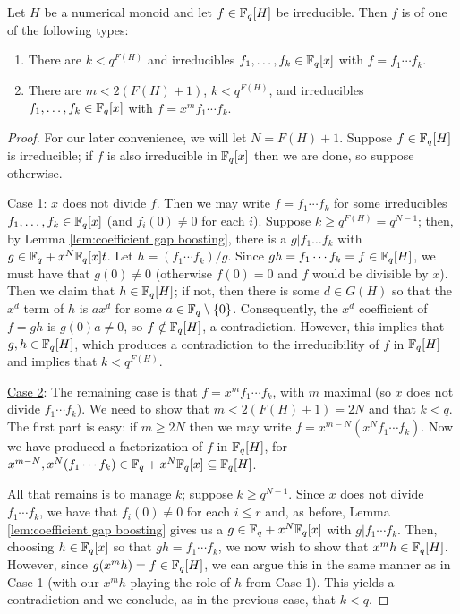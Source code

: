 \begin{prop}\label{prop:num ring atom classification}
Let $H$ be a numerical monoid and let $f\in \mathbb{F}_q[H]$ be irreducible.
Then $f$ is of one of the following types:
\begin{enumerate}[label=(\rm \arabic{*})]
	\item There are $k< q^{F(H)}$ and irreducibles $f_1,\dots,f_k\in \mathbb{F}_q[x]$ with $f = f_1\cdots f_k$.
	\item There are $m < 2(F(H)+1)$, $k < q^{F(H)}$, and irreducibles $f_1,\dots, f_k\in \mathbb{F}_q[x]$ with $f = x^m f_1\cdots f_k$.
\end{enumerate}

\begin{proof}
For our later convenience, we will let $N = F(H)+1$.
Suppose $f\in \mathbb{F}_q[H]$ is irreducible; if $f$ is also irreducible in $\mathbb{F}_q[x]$ then we are done, so suppose otherwise.  

\underline{Case 1}: $x$ does not divide $f$.
Then we may write $f = f_1\cdots f_k$ for some irreducibles $f_1,\dots,f_k\in \mathbb{F}_q[x]$ (and $f_i(0)\neq0$ for each $i$).
Suppose $k\ge q^{F(H)} = q^{N-1}$; then, by Lemma \ref{lem:coefficient gap boosting}, there is a $g|f_1\dots f_k$ with $g\in \mathbb{F}_q+x^N \mathbb{F}_q[x]t$.
Let $h = (f_1\cdots f_k)/g$.
Since $gh = f_1\cdots f_k = f \in \mathbb{F}_q[H]$, we must have that $g(0) \neq 0$ (otherwise $f(0)=0$ and $f$ would be divisible by $x$).
Then we claim that $h\in \mathbb{F}_q[H]$; if not, then there is some $d\in G(H)$ so that the $x^d$ term of $h$ is $a x^d$ for some $a\in \mathbb{F}_q\setminus\{0\}$.
Consequently, the $x^d$ coefficient of $f = gh$ is $g(0)a \neq 0$, so $f\notin \mathbb{F}_q[H]$, a contradiction.
However, this implies that $g,h\in \mathbb{F}_q[H]$, which produces a contradiction to the irreducibility of $f$ in $\mathbb{F}_q[H]$ and implies that $k < q^{F(H)}$.

\underline{Case 2}: The remaining case is that $f = x^m f_1\cdots f_k$, with $m$ maximal (so $x$ does not divide $f_1\cdots f_k$).
We need to show that $m<2(F(H)+1) = 2N$ and that $k<q$.
The first part is easy: if $m\ge 2N$ then we may write $f = x^{m-N} (x^N f_1\cdots f_k)$.
Now we have produced a factorization of $f$ in $\mathbb{F}_q[H]$, for $x^{m-N}, x^N (f_1\cdots f_k) \in \mathbb{F}_q + x^N \mathbb{F}_q[x] \subseteq \mathbb{F}_q[H]$.

All that remains is to manage $k$; suppose $k \ge q^{N-1}$.
Since $x$ does not divide $f_1 \cdots f_k$, we have that $f_i(0) \neq 0$ for each $i\le r$ and, as before, Lemma \ref{lem:coefficient gap boosting} gives us a $g\in \mathbb{F}_q+x^N \mathbb{F}_q[x]$ with $g|f_1\cdots f_k$.
Then, choosing $h\in \mathbb{F}_q[x]$ so that $gh = f_1\cdots f_k$, we now wish to show that $x^m h \in \mathbb{F}_q[H]$.
However, since $g (x^m h) = f \in \mathbb{F}_q[H]$, we can argue this in the same manner as in Case 1 (with our $x^m h$ playing the role of $h$ from Case 1).
This yields a contradiction and we conclude, as in the previous case, that $k< q$.
\end{proof}

\end{prop}


